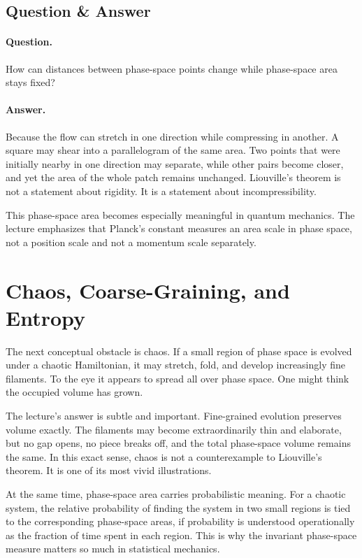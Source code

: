 \subsection{Question \& Answer}

\paragraph{Question.} How can distances between phase-space points change while phase-space area stays fixed?

\paragraph{Answer.} Because the flow can stretch in one direction while compressing in another. A square may shear into a parallelogram of the same area. Two points that were initially nearby in one direction may separate, while other pairs become closer, and yet the area of the whole patch remains unchanged. Liouville's theorem is not a statement about rigidity. It is a statement about incompressibility.

\begin{remark}
This phase-space area becomes especially meaningful in quantum mechanics. The lecture emphasizes that Planck's constant measures an area scale in phase space, not a position scale and not a momentum scale separately.
\end{remark}

\section{Chaos, Coarse-Graining, and Entropy}

The next conceptual obstacle is chaos. If a small region of phase space is evolved under a chaotic Hamiltonian, it may stretch, fold, and develop increasingly fine filaments. To the eye it appears to spread all over phase space. One might think the occupied volume has grown.

The lecture's answer is subtle and important. Fine-grained evolution preserves volume exactly. The filaments may become extraordinarily thin and elaborate, but no gap opens, no piece breaks off, and the total phase-space volume remains the same. In this exact sense, chaos is not a counterexample to Liouville's theorem. It is one of its most vivid illustrations.

At the same time, phase-space area carries probabilistic meaning. For a chaotic system, the relative probability of finding the system in two small regions is tied to the corresponding phase-space areas, if probability is understood operationally as the fraction of time spent in each region. This is why the invariant phase-space measure matters so much in statistical mechanics.

